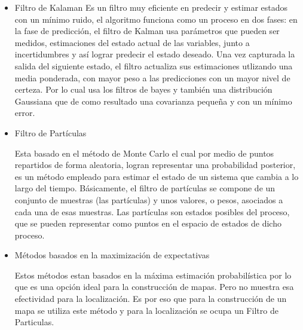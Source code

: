 \documentclass[12pt,a4paper]{article}
\begin{document}
\begin{itemize}
\item {Filtro de Kalaman}
Es un filtro muy eficiente en predecir y estimar estados con un mínimo ruido, el algoritmo funciona como un proceso en dos fases: en la fase de predicción, el filtro de Kalman usa parámetros que pueden ser medidos, estimaciones del estado actual de las variables, junto a incertidumbres y  así lograr predecir el estado deseado. Una vez capturada la salida del siguiente estado, el filtro actualiza sus estimaciones utlizando una media ponderada, con mayor peso a las predicciones con un mayor nivel de certeza. Por lo cual usa los filtros de bayes y también una distribución Gaussiana que de como resultado una covarianza pequeña y con un mínimo error. 

\item {Filtro de Partículas}

Esta basado en el método de Monte Carlo el cual por medio de puntos repartidos de forma aleatoria, logran representar una probabilidad posterior, es un método empleado para estimar el estado de un sistema que cambia a lo largo del tiempo.  Básicamente, el filtro de partículas se compone de un conjunto de muestras (las partículas) y unos valores, o pesos, asociados a cada una de esas muestras. Las partículas son estados posibles del proceso, que se pueden representar como puntos en el espacio de estados de dicho proceso.

\item {Métodos basados en la maximización de expectativas}

Estos métodos estan basados en la máxima estimación probabilística por lo que es una opción ideal para la construcción de mapas. Pero no muestra esa efectividad para la localización.
Es por eso que para la construcción de un mapa se utiliza este método y para la localización se ocupa un Filtro de Particulas.
\end{itemize}
\end{document}
